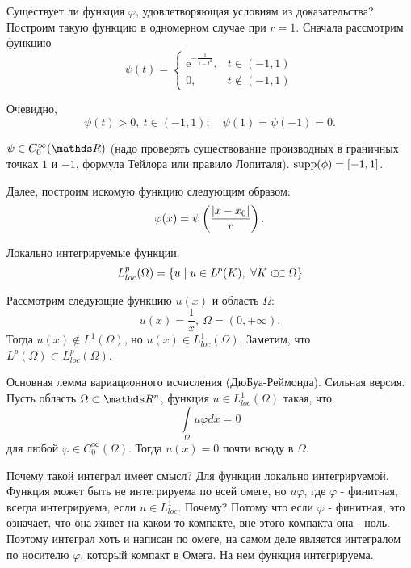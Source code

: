 \begin{note}
Существует ли функция $\varphi$, удовлетворяющая условиям из доказательства? 
Построим такую функцию в одномерном случае при $r = 1$. Сначала рассмотрим функцию
$$
    \psi(t) =
        \begin{cases} 
            \mathrm{e}^{-\frac{1}{1 - t^2}}, & t \in (-1, 1) \\
            0, & t \notin (-1, 1) 
        \end{cases}
$$

Очевидно, 
$$\psi(t) > 0, \ t \in (-1, 1); \quad \psi(1) = \psi(-1) = 0.$$ 

$\psi \in C_0^\infty(\real)$ (надо проверять существование производных в граничных точках $1$ и $-1$, формула Тейлора или правило Лопиталя). 
$\operatorname{supp}(\phi) = [-1, 1]$.

Далее, построим искомую функцию следующим образом:
$$\varphi(x) = \psi \left(\frac{\lvert x - x_0\rvert}{r}\right).$$
\end{note}

\begin{definition}{Локально интегрируемые функции.}
$$L_{loc}^p(\Omega) = \{u \mid u \in L^p(K),\ \forall K \ssubset \Omega\}$$
\end{definition}

\begin{example} Рассмотрим следующие функцию $u(x)$ и область $\Omega$:
$$u(x) = \frac{1}{x},\ \Omega = (0, +\infty).$$
Тогда $u(x) \notin L^1(\Omega)$, но $u(x) \in L_{loc}^1(\Omega)$. Заметим, что $L^p(\Omega) \subset L_{loc}^p(\Omega)$.
\end{example}

\begin{lemma}{Основная лемма вариационного исчисления (ДюБуа-Реймонда). Сильная версия.}
Пусть область $\Omega \subset \real^n$, функция $u \in L_{loc}^1(\Omega)$ такая, что 
$$\int \limits_{\Omega} u \varphi dx = 0$$ 
для любой $\varphi \in C_0^\infty(\Omega)$. Тогда $u(x) = 0$ почти всюду в $\Omega$.
\end{lemma}

Почему такой интеграл имеет смысл? Для функции локально интегрируемой. Функция может быть не интегрируема по всей омеге, но $u\varphi$, где $\varphi$ - финитная, всегда интегрируема, если $u \in L_{loc}^1$. Почему? Потому что если $\varphi$ - финитная, это означает, что она живет на каком-то компакте, вне этого компакта она - ноль. Поэтому интеграл хоть и написан по омеге, на самом деле является интегралом по носителю $\varphi$, который компакт в Омега. На нем функция интегрируема.


